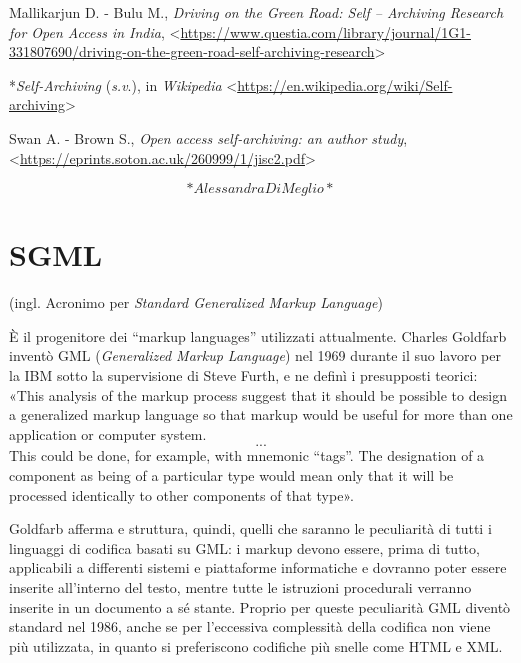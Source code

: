 \documentclass[
  b5paper,
  twoside,
  11pt,
  chapterprefix=false,
  bibliography=totocnumbered,
  parskip=0]{scrbook}
\begin{document}
Mallikarjun D. - Bulu M., \emph{Driving on the Green Road: Self -- Archiving
Research for Open Access in India},
\textless{}\href{https://www.questia.com/library/journal/1G1-331807690/driving-on-the-green-road-self-archiving-research}{{https://www.questia.com/library/journal/1G1-331807690/driving-on-the-green-road-self-archiving-research}}\textgreater{}

*\emph{Self-Archiving} (\emph{s.v}.), in \emph{Wikipedia}
\textless{}\href{https://en.wikipedia.org/wiki/Self-archiving}{{https://en.wikipedia.org/wiki/Self-archiving}}\textgreater{}

Swan A. - Brown S., \emph{Open access self-archiving: an author study},
\textless{}\href{https://eprints.soton.ac.uk/260999/1/jisc2.pdf}{{https://eprints.soton.ac.uk/260999/1/jisc2.pdf}}\textgreater{}

\[*Alessandra Di Meglio*\]

\hypertarget{sgml}{%
\chapter{SGML}\label{sgml}}

(ingl. Acronimo per \emph{Standard Generalized Markup Language})

È il progenitore dei \enquote{markup languages} utilizzati attualmente. Charles
Goldfarb inventò GML (\emph{Generalized Markup Language}) nel 1969 durante il
suo lavoro per la IBM sotto la supervisione di Steve Furth, e ne definì
i presupposti teorici: «This analysis of the markup process suggest that
it should be possible to design a generalized markup language so that
markup would be useful for more than one application or computer system.
\[...\] This could be done, for example, with mnemonic \enquote{tags}. The
designation of a component as being of a particular type would mean only
that it will be processed identically to other components of that type».

Goldfarb afferma e struttura, quindi, quelli che saranno le peculiarità
di tutti i linguaggi di codifica basati su GML: i markup devono essere,
prima di tutto, applicabili a differenti sistemi e piattaforme
informatiche e dovranno poter essere inserite all'interno del testo,
mentre tutte le istruzioni procedurali verranno inserite in un documento
a sé stante. Proprio per queste peculiarità GML diventò standard nel
1986, anche se per l'eccessiva complessità della codifica non viene più
utilizzata, in quanto si preferiscono codifiche più snelle come HTML e
XML.
\end{document}
